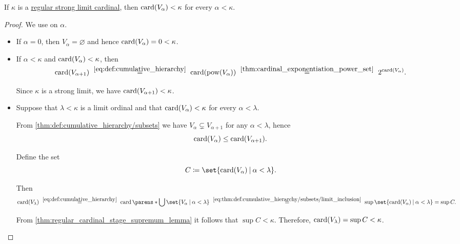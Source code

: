 \begin{proposition}\label{thm:strong_regular_cardinal_stages}
  If \( \kappa \) is a \hyperref[rem:strongly_inaccessible_cardinal]{regular strong limit cardinal}, then \( \operatorname{card}(V_\alpha) < \kappa \) for every \( \alpha < \kappa \).
\end{proposition}
\begin{proof}
  We use  on \( \alpha \).
  \begin{itemize}
    \item If \( \alpha = 0 \), then \( V_\alpha = \varnothing \) and hence \( \operatorname{card}(V_\alpha) = 0 < \kappa \).
    \item If \( \alpha < \kappa \) and \( \operatorname{card}(V_\alpha) < \kappa \), then
    \begin{equation*}
      \card(V_{\alpha + 1})
      \reloset {\eqref{eq:def:cumulative_hierarchy}} =
      \card(\pow(V_\alpha))
      \reloset {\ref{thm:cardinal_exponentiation_power_set}} =
      2^{\card(V_\alpha)}.
    \end{equation*}

    Since \( \kappa \) is a strong limit, we have \( \operatorname{card}(V_{\alpha + 1}) < \kappa \).

    \item Suppose that \( \lambda < \kappa \) is a limit ordinal and that \( \operatorname{card}(V_\alpha) < \kappa \) for every \( \alpha < \lambda \).

    From \cref{thm:def:cumulative_hierarchy/subsets} we have \( V_\alpha \subsetneq V_{\alpha + 1} \) for any \( \alpha < \lambda \), hence
    \begin{equation}\label{eq:thm:def:cumulative_hierarchy/subsets/limit_inclusion}
      \operatorname{card}(V_\alpha) \leq \operatorname{card}(V_{\alpha + 1}).
    \end{equation}

    Define the set
    \begin{equation*}
      C \coloneqq \set{ \card(V_\alpha) \given \alpha < \lambda }.
    \end{equation*}

    Then
    \begin{equation*}
      \card(V_\lambda)
      \reloset {\eqref{eq:def:cumulative_hierarchy}} =
      \card\parens*{ \bigcup \set{ V_\alpha \given \alpha < \lambda } }
      \reloset {\eqref{eq:thm:def:cumulative_hierarchy/subsets/limit_inclusion}} =
      \sup\set{ \card(V_\alpha) \given \alpha < \lambda }
      =
      \sup C.
    \end{equation*}

    From \cref{thm:regular_cardinal_stage_supremum_lemma} it follows that \( \sup C < \kappa \). Therefore, \( \operatorname{card}(V_\lambda) = \sup C < \kappa \).
  \end{itemize}
\end{proof}


